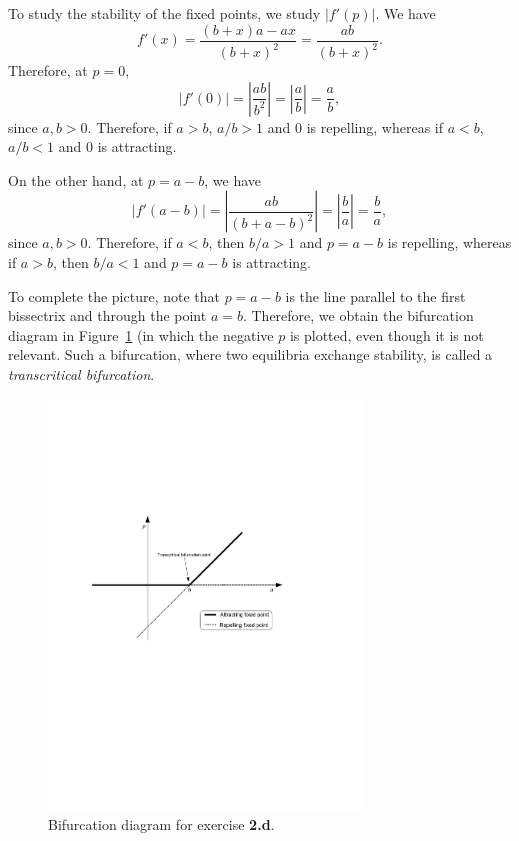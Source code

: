 \documentclass[12pt]{article}
\theoremstyle{plain}
\begin{document}
To study the stability of the fixed points, we study $|f'(p)|$. We have
\[
f'(x)=\frac{(b+x)a-ax}{(b+x)^2}=\frac{ab}{(b+x)^2}.
\]
Therefore, at $p=0$,
\[
|f'(0)|=\left|\frac{ab}{b^2}\right|=\left|\frac ab\right|=\frac ab,
\]
since $a,b>0$. Therefore, if $a>b$, $a/b>1$ and $0$ is repelling, whereas if $a<b$, $a/b<1$ and $0$ is attracting.

On the other hand, at $p=a-b$, we have
\[
|f'(a-b)|=\left|\frac{ab}{(b+a-b)^2}\right|=\left|\frac ba\right|=\frac ba,
\]
since $a,b>0$. Therefore, if $a<b$, then $b/a>1$ and $p=a-b$ is repelling, whereas if $a>b$, then $b/a<1$ and $p=a-b$ is attracting.

\vskip0.5cm
To complete the picture, note that $p=a-b$ is the line parallel to the first bissectrix and through the point $a=b$. Therefore, we obtain the bifurcation diagram in Figure~\ref{fig:3} (in which the negative $p$ is plotted, even though it is not relevant. Such a bifurcation, where two equilibria exchange stability, is called a \emph{transcritical bifurcation}.
\begin{figure}[htbp]
\begin{center}
\includegraphics[width=0.75\textwidth]{fig2_midterm2007_solutions}
\caption{Bifurcation diagram for exercise {\bf 2.d}.}
\label{fig:3}
\end{center}
\end{figure}
\end{document}

